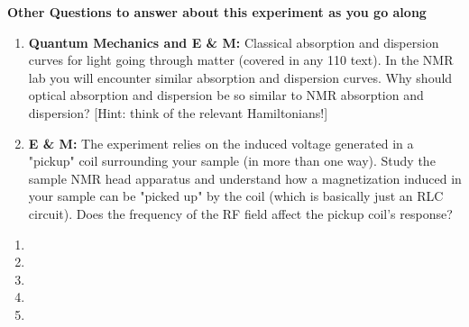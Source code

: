 \documentclass{../signatures}
\begin{document}

\textbf{Other Questions to answer about this experiment as you go along}

\begin{enumerate}

    \item \textbf{Quantum Mechanics and E & M:} Classical absorption and dispersion curves for light going through matter (covered in any 110 text). In the NMR lab you will encounter similar absorption and dispersion curves. Why should optical absorption and dispersion be so similar to NMR absorption and dispersion? [Hint: think of the relevant Hamiltonians!]

    \item \textbf{E & M:} The experiment relies on the induced voltage generated in a "pickup" coil surrounding your sample (in more than one way). Study the sample NMR head apparatus and understand how a magnetization induced in your sample can be "picked up" by the coil (which is basically just an RLC circuit). Does the frequency of the RF field affect the pickup coil's response?
    \\[24pt]

\end{enumerate}

\pagebreak

\checkpointsection 

\begin{enumerate}

\item {}

\item {}

\item {}

\item {}

\item {}

\end{enumerate}
\end{document}
